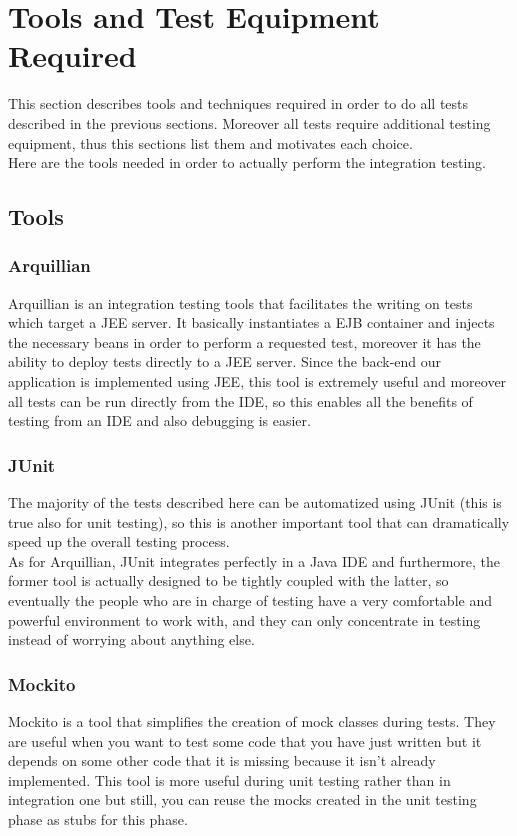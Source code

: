 \newpage
\section{Tools and Test Equipment Required}
This section describes tools and techniques required in order to do all tests described in the previous sections. Moreover all tests require additional testing equipment, thus this sections list them and motivates each choice. \\
Here are the tools needed in order to actually perform the integration testing.

\subsection{Tools}

\subsubsection{Arquillian}
Arquillian is an integration testing tools that facilitates the writing on tests which target a JEE server. It basically instantiates a EJB container and injects the necessary beans in order to perform a requested test, moreover it has the ability to deploy tests directly to a JEE server. Since the back-end our application is implemented using JEE, this tool is extremely useful and moreover all tests can be run directly from the IDE, so this enables all the benefits of testing from an IDE and also debugging is easier.

\subsubsection{JUnit}
The majority of the tests described here can be automatized using JUnit (this is true also for unit testing), so this is another important tool that can dramatically speed up the overall testing process. \\ As for Arquillian, JUnit integrates perfectly in a Java IDE and furthermore, the former tool is actually designed to be tightly coupled with the latter, so eventually the people who are in charge of testing have a very comfortable and powerful environment to work with, and they can only concentrate in testing instead of worrying about anything else. 

\subsubsection{Mockito}
Mockito is a tool that simplifies the creation of mock classes during tests. They are useful when you want to test some code that you have just written but it depends on some other code that it is missing because it isn't already implemented. This tool is more useful during unit testing rather than in integration one but still, you can reuse the mocks created in the unit testing phase as stubs for this phase.

